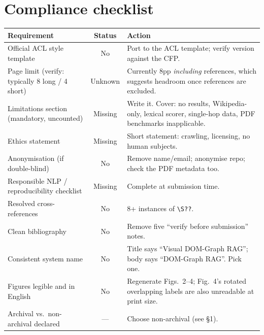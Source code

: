 \documentclass[11pt,a4paper]{article}
\begin{document}
\section{Compliance checklist}

\begin{center}
\begin{tabularx}{\textwidth}{@{}L{6.6cm}cX@{}}
\toprule
\textbf{Requirement} & \textbf{Status} & \textbf{Action} \\
\midrule
Official ACL style template & \textcolor{blockred}{No} & Port to the ACL template; verify version against the CFP. \\
Page limit (verify: typically 8 long / 4 short) & \textcolor{majororange}{Unknown} & Currently 8pp \emph{including} references, which suggests headroom once references are excluded. \\
Limitations section (mandatory, uncounted) & \textcolor{blockred}{Missing} & Write it. Cover: no results, Wikipedia-only, lexical scorer, single-hop data, PDF benchmarks inapplicable. \\
Ethics statement & \textcolor{majororange}{Missing} & Short statement: crawling, licensing, no human subjects. \\
Anonymisation (if double-blind) & \textcolor{blockred}{No} & Remove name/email; anonymise repo; check the PDF metadata too. \\
Responsible NLP / reproducibility checklist & \textcolor{majororange}{Missing} & Complete at submission time. \\
Resolved cross-references & \textcolor{blockred}{No} & 8+ instances of \verb|\S??|. \\
Clean bibliography & \textcolor{blockred}{No} & Remove five ``verify before submission'' notes. \\
Consistent system name & \textcolor{mingray}{No} & Title says ``Visual DOM-Graph RAG''; body says ``DOM-Graph RAG''. Pick one. \\
Figures legible and in English & \textcolor{blockred}{No} & Regenerate Figs.~2--4; Fig.~4's rotated overlapping labels are also unreadable at print size. \\
Archival vs.\ non-archival declared & --- & Choose non-archival (see \S1). \\
\bottomrule
\end{tabularx}
\end{center}

\end{document}
